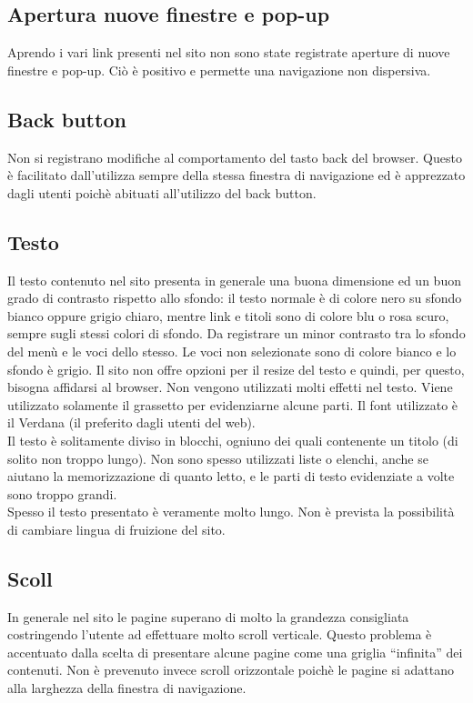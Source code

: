 \documentclass[../ProgettoTecWeb2.tex]{subfiles}
\begin{document}
	\subsection{Apertura nuove finestre e pop-up}
	Aprendo i vari link presenti nel sito non sono state registrate aperture di nuove finestre e pop-up. Ciò è positivo e permette una navigazione non dispersiva.

	\subsection{Back button}
	Non si registrano modifiche al comportamento del tasto back del browser. Questo è facilitato dall'utilizza sempre della stessa finestra di navigazione ed è apprezzato dagli utenti poichè abituati all'utilizzo del back button.

	\subsection{Testo}
	Il testo contenuto nel sito presenta in generale una buona dimensione ed un buon grado di contrasto rispetto allo sfondo: il testo normale è di colore nero su sfondo bianco oppure grigio chiaro, mentre link e titoli sono di colore blu o rosa scuro, sempre sugli stessi colori di sfondo. Da registrare un minor contrasto tra lo sfondo del menù e le voci dello stesso. Le voci non selezionate sono di colore bianco e lo sfondo è grigio. Il sito non offre opzioni per il resize del testo e quindi, per questo, bisogna affidarsi al browser. Non vengono utilizzati molti effetti nel testo. Viene utilizzato solamente il grassetto per evidenziarne alcune parti. Il font utilizzato è il Verdana (il preferito dagli utenti del web). \\
	
	Il testo è solitamente diviso in blocchi, ogniuno dei quali contenente un titolo (di solito non troppo lungo). Non sono spesso utilizzati liste o elenchi, anche se aiutano la memorizzazione di quanto letto, e le parti di testo evidenziate a volte sono troppo grandi. \\
	
	Spesso il testo presentato è veramente molto lungo. Non è prevista la possibilità di cambiare lingua di fruizione del sito.

	\subsection{Scoll}
	In generale nel sito le pagine superano di molto la grandezza consigliata costringendo l'utente ad effettuare molto scroll verticale. Questo problema è accentuato dalla scelta di presentare alcune pagine come una griglia ``infinita'' dei contenuti. Non è prevenuto invece scroll orizzontale poichè le pagine si adattano alla larghezza della finestra di navigazione.
\end{document}
